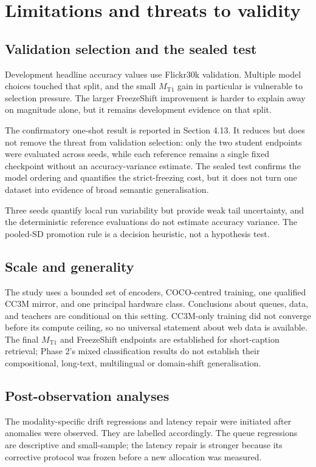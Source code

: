 \documentclass[11pt,a4paper,oneside]{report}
\newcommand{\MTone}{\ensuremath{M_{\mathrm{T1}}}}
\begin{document}
\chapter{Limitations and threats to validity}
\section{Validation selection and the sealed test}
Development headline accuracy values use Flickr30k validation. Multiple model choices touched that split, and the small \MTone{} gain in particular is vulnerable to selection pressure. The larger FreezeShift improvement is harder to explain away on magnitude alone, but it remains development evidence on that split.

The confirmatory one-shot result is reported in Section 4.13. It reduces but does not remove the threat from validation selection: only the two student endpoints were evaluated across seeds, while each reference remains a single fixed checkpoint without an accuracy-variance estimate. The sealed test confirms the model ordering and quantifies the strict-freezing cost, but it does not turn one dataset into evidence of broad semantic generalisation.

Three seeds quantify local run variability but provide weak tail uncertainty, and the deterministic reference evaluations do not estimate accuracy variance. The pooled-SD promotion rule is a decision heuristic, not a hypothesis test.

\section{Scale and generality}
The study uses a bounded set of encoders, COCO-centred training, one qualified CC3M mirror, and one principal hardware class. Conclusions about queues, data, and teachers are conditional on this setting. CC3M-only training did not converge before its compute ceiling, so no universal statement about web data is available. The final \MTone{} and FreezeShift endpoints are established for short-caption retrieval; Phase 2's mixed classification results do not establish their compositional, long-text, multilingual or domain-shift generalisation.

\section{Post-observation analyses}
The modality-specific drift regressions and latency repair were initiated after anomalies were observed. They are labelled accordingly. The queue regressions are descriptive and small-sample; the latency repair is stronger because its corrective protocol was frozen before a new allocation was measured.
\end{document}

